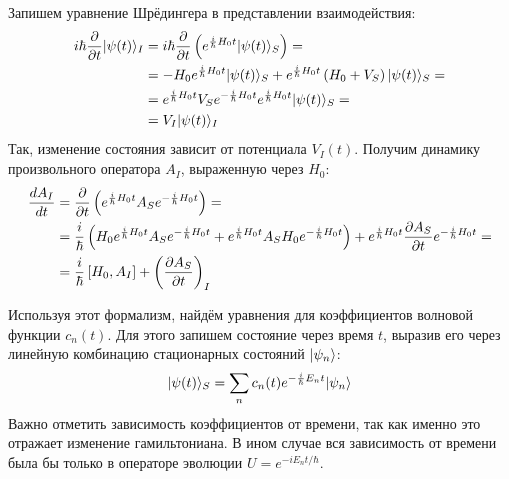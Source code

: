 Запишем уравнение Шрёдингера в представлении взаимодействия:
\begin{align*}
  i\hbar\frac{\partial }{\partial t}\lvert\psi(t)\rangle_I &= i\hbar\frac{\partial }{\partial t}\left( e^{\frac{i}{\hbar} H_0 t} \lvert\psi(t)\rangle_S \right) =\\
  &= -H_0  e^{\frac{i}{\hbar} H_0 t}\lvert\psi(t)\rangle_S +  e^{\frac{i}{\hbar} H_0 t}\left( H_0 + V_S \right)\lvert\psi(t)\rangle_S =\\
  &=  e^{\frac{i}{\hbar} H_0 t} V_S  e^{-\frac{i}{\hbar} H_0 t}  e^{\frac{i}{\hbar} H_0 t}\lvert\psi(t)\rangle_S=\\
  &= V_I\lvert\psi(t)\rangle_I
\end{align*}
Так, изменение состояния зависит от потенциала $V_I(t)$. Получим динамику
произвольного оператора $A_I$, выраженную через $H_0$:
\begin{align*}
  \frac{d A_I}{d t} &= \frac{\partial }{\partial t}\left( e^{\frac{i}{\hbar} H_0 t} A_S e^{-\frac{i}{\hbar} H_0 t} \right) =\\
  &= \frac{i}{\hbar} \left(H_0  e^{\frac{i}{\hbar} H_0 t}A_Se^{-\frac{i}{\hbar} H_0 t} + e^{\frac{i}{\hbar} H_0 t} A_S H_0 e^{-\frac{i}{\hbar} H_0 t}\right) +  e^{\frac{i}{\hbar} H_0 t}\frac{\partial A_S}{\partial t}e^{-\frac{i}{\hbar} H_0 t} =\\
  &=  \frac{i}{\hbar}\left[ H_0, A_I \right]  + \left(\frac{\partial A_S}{\partial t}\right)_I
\end{align*}

Используя этот формализм, найдём уравнения для коэффициентов волновой функции
$c_n(t)$. Для этого запишем состояние через время $t$, выразив его через
линейную комбинацию стационарных состояний $\lvert\psi_n\rangle$:
\[
  \lvert\psi(t)\rangle_S = \sum\limits_{n}c_n(t)e^{-\frac{i}{\hbar}E_n t}\lvert\psi_n\rangle
\]
Важно отметить зависимость коэффициентов от времени, так как именно это
отражает изменение гамильтониана. В ином случае вся зависимость от времени была
бы только в операторе эволюции $U = e^{-iE_n t/\hbar}$.


